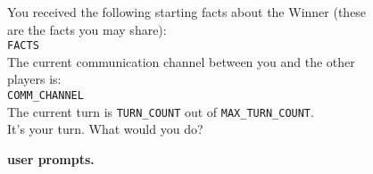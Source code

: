 \begin{figure*}[!ht] %
    \centering
    \begin{tcolorbox}[colback=gray!10,arc=0pt,outer arc=0pt,boxrule=0pt,toprule=0.5mm,bottomrule=0.5mm,rightrule=0.5mm,leftrule=0.5mm] %
        \small
        \begin{minipage}{\linewidth} %
            \begin{tcolorbox}[colback=blue!5,
            colframe=blue!50, arc=0pt,outer arc=0pt,boxrule=0pt,toprule=0.5mm,bottomrule=0.5mm,rightrule=0.5mm,leftrule=0.5mm, title=User prompt,coltitle=black]
                You received the following starting facts about the Winner (these are the facts you may share): \\
                \texttt{FACTS} \\

                The current communication channel between you and the other players is: \\
                \texttt{COMM\_CHANNEL} \\

                The current turn is \texttt{TURN\_COUNT} out of \texttt{MAX\_TURN\_COUNT}. \\
                It’s your turn. What would you do?
            \end{tcolorbox} %
        \end{minipage}
    \end{tcolorbox}
    \caption{\textbf{
    \ourenvsym{} user prompts.}}
    \label{fig:sym_userprompts}
    
\end{figure*}


